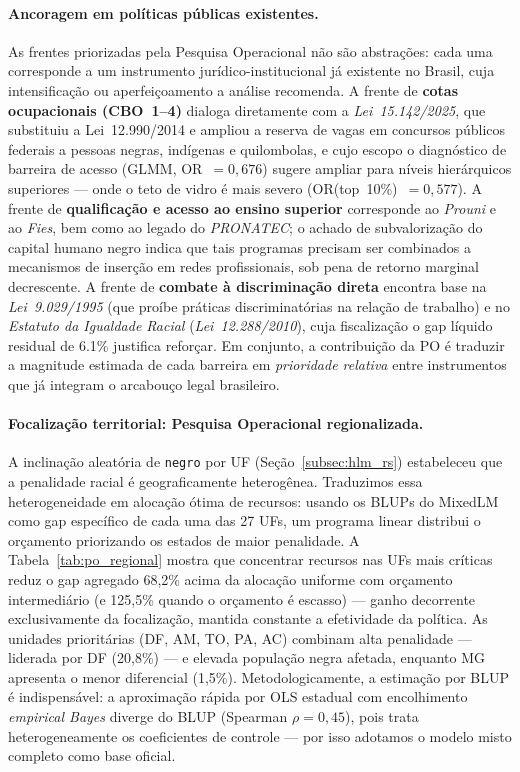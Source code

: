 \documentclass[12pt, a4paper, oneside]{article}
\begin{document}
\paragraph{Ancoragem em políticas públicas existentes.}
As frentes priorizadas pela Pesquisa Operacional não são abstrações: cada uma
corresponde a um instrumento jurídico-institucional já existente no Brasil, cuja
intensificação ou aperfeiçoamento a análise recomenda.
A frente de \textbf{cotas ocupacionais (CBO~1--4)} dialoga diretamente com a
\textit{Lei~15.142/2025}, que substituiu a Lei~12.990/2014 e ampliou a
reserva de vagas em concursos públicos federais a pessoas negras, indígenas e
quilombolas, e cujo escopo o diagnóstico de barreira de acesso
(GLMM, OR~$=0,676$) sugere ampliar para níveis hierárquicos
superiores --- onde o teto de vidro é mais severo
(OR(top~10\%)~$=0,577$).
A frente de \textbf{qualificação e acesso ao ensino superior} corresponde ao
\textit{Prouni} e ao \textit{Fies}, bem como ao legado do \textit{PRONATEC};
o achado de subvalorização do capital humano negro indica que tais programas
precisam ser combinados a mecanismos de inserção em redes profissionais, sob pena
de retorno marginal decrescente.
A frente de \textbf{combate à discriminação direta} encontra base na
\textit{Lei~9.029/1995} (que proíbe práticas discriminatórias na relação de
trabalho) e no \textit{Estatuto da Igualdade Racial} (\textit{Lei~12.288/2010}),
cuja fiscalização o gap líquido residual de 6.1\% justifica reforçar.
Em conjunto, a contribuição da PO é traduzir a magnitude estimada de cada
barreira em \textit{prioridade relativa} entre instrumentos que já integram o
arcabouço legal brasileiro.

\paragraph{Focalização territorial: Pesquisa Operacional regionalizada.}
A inclinação aleatória de \texttt{negro} por UF (Seção~\ref{subsec:hlm_rs}) estabeleceu que a penalidade racial é geograficamente heterogênea. Traduzimos essa heterogeneidade em alocação ótima de recursos: usando os BLUPs do MixedLM como gap específico de cada uma das 27 UFs, um programa linear distribui o orçamento priorizando os estados de maior penalidade. A Tabela~\ref{tab:po_regional} mostra que concentrar recursos nas UFs mais críticas reduz o gap agregado 68,2\% acima da alocação uniforme com orçamento intermediário (e 125,5\% quando o orçamento é escasso) --- ganho decorrente exclusivamente da focalização, mantida constante a efetividade da política. As unidades prioritárias (DF, AM, TO, PA, AC) combinam alta penalidade --- liderada por DF (20,8\%) --- e elevada população negra afetada, enquanto MG apresenta o menor diferencial (1,5\%). Metodologicamente, a estimação por BLUP é indispensável: a aproximação rápida por OLS estadual com encolhimento \textit{empirical Bayes} diverge do BLUP (Spearman $\rho=0,45$), pois trata heterogeneamente os coeficientes de controle --- por isso adotamos o modelo misto completo como base oficial.
\end{document}
